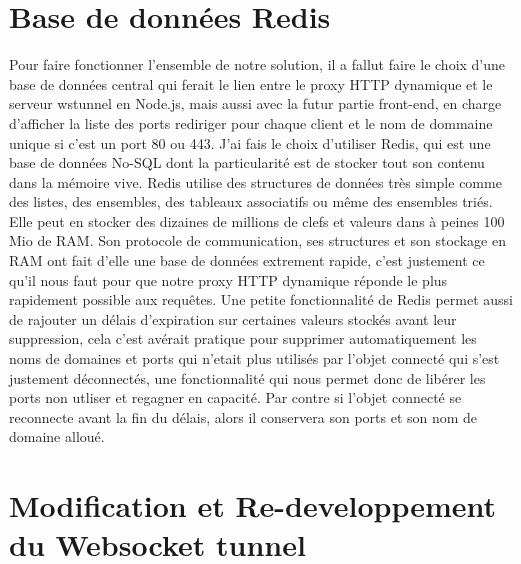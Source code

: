 \section{Base de données Redis}

Pour faire fonctionner l'ensemble de notre solution, il a fallut faire le choix d'une base de données central qui ferait le lien entre le proxy HTTP dynamique et le serveur wstunnel en Node.js, mais aussi avec la futur partie front-end, en charge d'afficher la liste des ports rediriger pour chaque client et le nom de dommaine unique si c'est un port 80 ou 443. J'ai fais le choix d'utiliser Redis, qui est une base de données No-SQL dont la particularité est de stocker tout son contenu dans la mémoire vive. Redis utilise des structures de données très simple comme des listes, des ensembles, des tableaux associatifs ou même des ensembles triés. Elle peut en stocker des dizaines de millions de clefs et valeurs dans à peines 100 Mio de RAM. Son protocole de communication, ses structures et son stockage en RAM ont fait d'elle une base de données extrement rapide, c'est justement ce qu'il nous faut pour que notre proxy HTTP dynamique réponde le plus rapidement possible aux requêtes. Une petite fonctionnalité de Redis permet aussi de rajouter un délais d'expiration sur certaines valeurs stockés avant leur suppression, cela c'est avérait pratique pour supprimer automatiquement les noms de domaines et ports qui n'etait plus utilisés par l'objet connecté qui s'est justement déconnectés, une fonctionnalité qui nous permet donc de libérer les ports non utliser et regagner en capacité. Par contre si l'objet connecté se reconnecte avant la fin du délais, alors il conservera son ports et son nom de domaine alloué.

\section{Modification et Re-developpement du Websocket tunnel}


